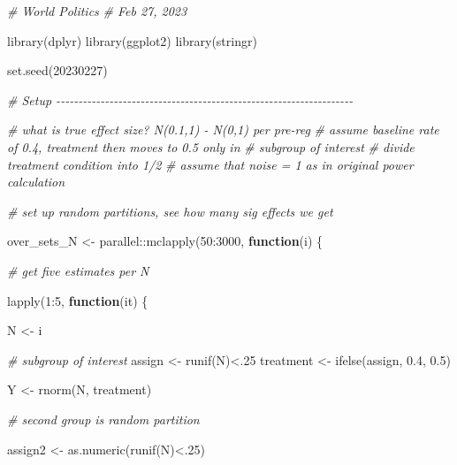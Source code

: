 \documentclass[12pt, letterpaper]{article}
\newenvironment{Shaded}{\begin{snugshade}}{\end{snugshade}}
\newcommand{\CommentTok}[1]{\textcolor[rgb]{0.56,0.35,0.01}{\textit{#1}}}
\newcommand{\ControlFlowTok}[1]{\textcolor[rgb]{0.13,0.29,0.53}{\textbf{#1}}}
\newcommand{\DecValTok}[1]{\textcolor[rgb]{0.00,0.00,0.81}{#1}}
\newcommand{\FloatTok}[1]{\textcolor[rgb]{0.00,0.00,0.81}{#1}}
\newcommand{\FunctionTok}[1]{\textcolor[rgb]{0.00,0.00,0.00}{#1}}
\newcommand{\NormalTok}[1]{#1}
\newcommand{\OtherTok}[1]{\textcolor[rgb]{0.56,0.35,0.01}{#1}}
\newcommand{\SpecialCharTok}[1]{\textcolor[rgb]{0.00,0.00,0.00}{#1}}
\begin{document}
\begin{Shaded}
\begin{Highlighting}[]

\CommentTok{\# World Politics}
\CommentTok{\# Feb 27, 2023}

\FunctionTok{library}\NormalTok{(dplyr)}
\FunctionTok{library}\NormalTok{(ggplot2)}
\FunctionTok{library}\NormalTok{(stringr)}


\FunctionTok{set.seed}\NormalTok{(}\DecValTok{20230227}\NormalTok{)}


\CommentTok{\# Setup {-}{-}{-}{-}{-}{-}{-}{-}{-}{-}{-}{-}{-}{-}{-}{-}{-}{-}{-}{-}{-}{-}{-}{-}{-}{-}{-}{-}{-}{-}{-}{-}{-}{-}{-}{-}{-}{-}{-}{-}{-}{-}{-}{-}{-}{-}{-}{-}{-}{-}{-}{-}{-}{-}{-}{-}{-}{-}{-}{-}{-}{-}{-}{-}{-}{-}{-}}

\CommentTok{\# what is true effect size? N(0.1,1) {-} N(0,1) per pre{-}reg}
\CommentTok{\# assume baseline rate of 0.4, treatment then moves to 0.5 only in }
\CommentTok{\# subgroup of interest}
\CommentTok{\# divide treatment condition into 1/2}
\CommentTok{\# assume that noise = 1 as in original power calculation}

\CommentTok{\# set up random partitions, see how many sig effects we get}

\NormalTok{over\_sets\_N }\OtherTok{\textless{}{-}}\NormalTok{ parallel}\SpecialCharTok{::}\FunctionTok{mclapply}\NormalTok{(}\DecValTok{50}\SpecialCharTok{:}\DecValTok{3000}\NormalTok{, }\ControlFlowTok{function}\NormalTok{(i) \{}
  
  \CommentTok{\# get five estimates per N}
  
    \FunctionTok{lapply}\NormalTok{(}\DecValTok{1}\SpecialCharTok{:}\DecValTok{5}\NormalTok{, }\ControlFlowTok{function}\NormalTok{(it) \{}
      
\NormalTok{      N }\OtherTok{\textless{}{-}}\NormalTok{ i}
      
      \CommentTok{\# subgroup of interest}
\NormalTok{      assign }\OtherTok{\textless{}{-}} \FunctionTok{runif}\NormalTok{(N)}\SpecialCharTok{\textless{}}\NormalTok{.}\DecValTok{25}
\NormalTok{      treatment }\OtherTok{\textless{}{-}} \FunctionTok{ifelse}\NormalTok{(assign, }\FloatTok{0.4}\NormalTok{, }\FloatTok{0.5}\NormalTok{)}
      
\NormalTok{      Y }\OtherTok{\textless{}{-}} \FunctionTok{rnorm}\NormalTok{(N, treatment)}
      
      \CommentTok{\# second group is random partition}
      
\NormalTok{      assign2 }\OtherTok{\textless{}{-}} \FunctionTok{as.numeric}\NormalTok{(}\FunctionTok{runif}\NormalTok{(N)}\SpecialCharTok{\textless{}}\NormalTok{.}\DecValTok{25}\NormalTok{)}
      

\end{Highlighting}
\end{Shaded}
\end{document}
